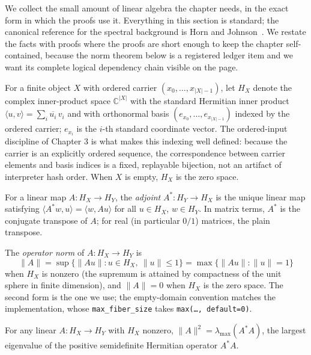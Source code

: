We collect the small amount of linear algebra the chapter needs, in the exact
form in which the proofs use it. Everything in this section is standard; the
canonical reference for the spectral background is Horn and
Johnson~\cite{horn}. We restate the facts with proofs where the proofs are
short enough to keep the chapter self-contained, because the norm theorem
below is a registered ledger item and we want its complete logical
dependency chain visible on the page.

\begin{notation}\label{ch07:not:spaces}
For a finite object $X$ with ordered carrier $(x_0,\dots,x_{|X|-1})$, let
$H_X$ denote the complex inner-product space $\mathbb{C}^{|X|}$ with the
standard Hermitian inner product
$\langle u,v\rangle=\sum_{i} \overline{u_i}\,v_i$
and with orthonormal basis $(e_{x_0},\dots,e_{x_{|X|-1}})$ indexed by the
ordered carrier; $e_{x_i}$ is the $i$-th standard coordinate vector. The
ordered-input discipline of Chapter 3 is what makes this
indexing well defined: because the carrier is an explicitly ordered sequence,
the correspondence between carrier elements and basis indices is a fixed,
replayable bijection, not an artifact of interpreter hash order. When $X$ is
empty, $H_X$ is the zero space.
\end{notation}

\begin{definition}[Adjoint]\label{ch07:def:adjoint}
For a linear map $A:H_X\to H_Y$, the \emph{adjoint} $A^*:H_Y\to H_X$ is the
unique linear map satisfying
$\langle A^* w, u\rangle = \langle w, A u\rangle$
for all $u\in H_X$, $w\in H_Y$. In matrix terms, $A^*$ is the conjugate
transpose of $A$; for real (in particular $0/1$) matrices, the plain
transpose.
\end{definition}

\begin{definition}\label{ch07:def:opnorm}
The \emph{operator norm} of $A:H_X\to H_Y$ is
\[
\lVert A\rVert
=\sup\{\lVert A u\rVert : u\in H_X,\ \lVert u\rVert\le 1\}
=\max\{\lVert A u\rVert : \lVert u\rVert = 1\}
\]
when $H_X$ is nonzero (the supremum is attained by compactness of the unit
sphere in finite dimension), and $\lVert A\rVert=0$ when $H_X$ is the zero
space. The second form is the one we use; the empty-domain convention matches
the implementation, whose \texttt{max\_fiber\_size} takes
\texttt{max(\ldots, default=0)}.
\end{definition}

\begin{lemma}\label{ch07:lem:gramreduction}
For any linear $A:H_X\to H_Y$ with $H_X$ nonzero,
$\lVert A\rVert^2=\lambda_{\max}(A^*A)$, the largest eigenvalue of the
positive semidefinite Hermitian operator $A^*A$.
\end{lemma}

